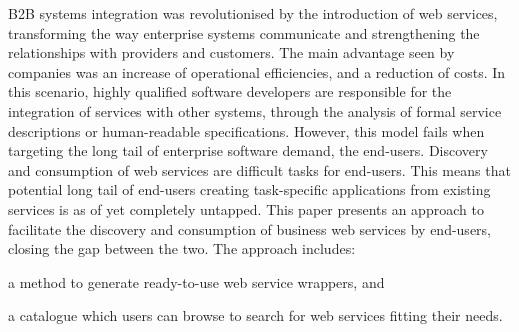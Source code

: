 
B2B systems integration was revolutionised by the introduction of web services,
transforming the way enterprise systems communicate and strengthening the  relationships with providers and customers. The main advantage seen by companies was an increase of operational efficiencies, and a reduction of costs. 
In this scenario, highly qualified software developers are responsible for the integration of services with other systems, through the analysis of formal service descriptions or human-readable specifications. 
However, this model fails when targeting the long tail of enterprise software demand, the end-users. 
Discovery and consumption of web services are difficult tasks for end-users. 
This means that potential long tail of end-users creating task-specific applications from existing services is as of yet completely untapped. 
This paper presents an approach to facilitate the discovery and consumption of business web services by end-users, closing the gap between the two. The approach includes: 
\begin{inparaenum}[(a)]
	\item a method to generate ready-to-use web service wrappers, and 
	\item a catalogue which users can browse to search for web services fitting their needs. 
\end{inparaenum}

